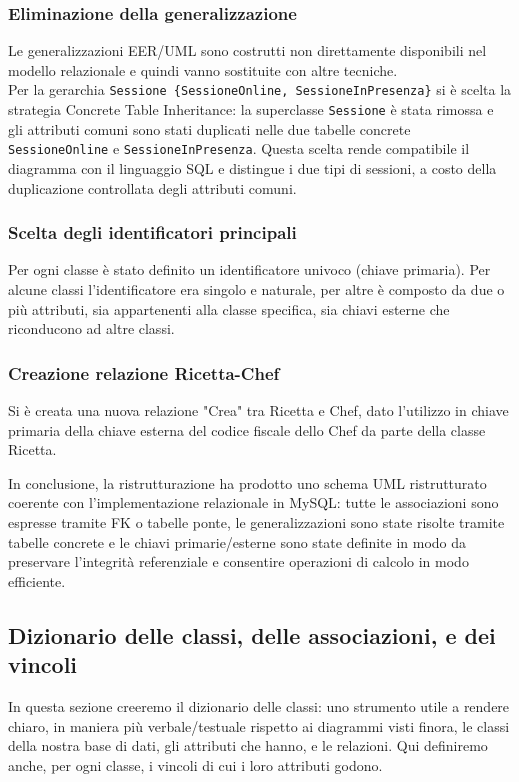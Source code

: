 \documentclass[a4paper, 12pt]{article}
\begin{document}
        \subsubsection{Eliminazione della generalizzazione} Le generalizzazioni EER/UML sono costrutti non direttamente disponibili nel modello relazionale e quindi vanno sostituite con altre tecniche.\\[0.2cm]
        Per la gerarchia \texttt{Sessione \{SessioneOnline, SessioneInPresenza\}} si è scelta la strategia Concrete Table Inheritance: la superclasse \texttt{Sessione} è stata rimossa e gli attributi comuni sono stati duplicati nelle due tabelle concrete \texttt{SessioneOnline} e \texttt{SessioneInPresenza}. Questa scelta rende compatibile il diagramma con il linguaggio SQL e distingue i due tipi di sessioni, a costo della duplicazione controllata degli attributi comuni.
    
        \subsubsection{Scelta degli identificatori principali}
        Per ogni classe è stato definito un identificatore univoco (chiave primaria). Per alcune classi l'identificatore era singolo e naturale, per altre è composto da due o più attributi, sia appartenenti alla classe specifica, sia chiavi esterne che riconducono ad altre classi.
    
        \subsubsection{Creazione relazione Ricetta-Chef}
        Si è creata una nuova relazione "Crea" tra Ricetta e Chef, dato l'utilizzo in chiave primaria della chiave esterna del codice fiscale dello Chef da parte della classe Ricetta.
    
        \bigskip
        In conclusione, la ristrutturazione ha prodotto uno schema UML ristrutturato coerente con l'implementazione relazionale in MySQL: tutte le associazioni sono espresse tramite FK o tabelle ponte, le generalizzazioni sono state risolte tramite tabelle concrete e le chiavi primarie/esterne sono state definite in modo da preservare l'integrità referenziale e consentire operazioni di calcolo in modo efficiente.

    \newpage
    
    \subsection{Dizionario delle classi, delle associazioni, e dei vincoli}
    In questa sezione creeremo il dizionario delle classi: uno strumento utile a rendere chiaro, in maniera più verbale/testuale rispetto ai diagrammi visti finora, le classi della nostra base di dati, gli attributi che hanno, e le relazioni. Qui definiremo anche, per ogni classe, i vincoli di cui i loro attributi godono.
\end{document}
